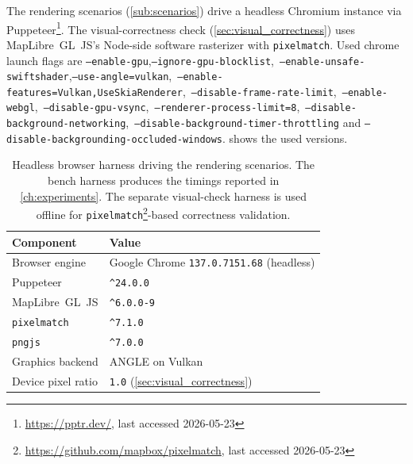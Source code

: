 The rendering scenarios (\cref{sub:scenarios}) drive a headless Chromium instance via Puppeteer\footnote{\url{https://pptr.dev/}, last accessed 2026-05-23}.
The visual-correctness check (\cref{sec:visual_correctness}) uses MapLibre~GL~JS's Node-side software rasterizer with \texttt{pixelmatch}.
Used chrome launch flags are \texttt{--enable-gpu},\allowbreak\texttt{--ignore-gpu-blocklist},\allowbreak\
\texttt{--enable-unsafe-swiftshader},\allowbreak\texttt{--use-angle=vulkan},\allowbreak\
\texttt{--enable-features=Vulkan,UseSkiaRenderer},\allowbreak\
\texttt{--disable-frame-rate-limit},\allowbreak\
\texttt{--enable-webgl},\allowbreak\
\texttt{--disable-gpu-vsync},\allowbreak\
\texttt{--renderer-process-limit=8},\allowbreak\
\texttt{--disable-background-networking},\allowbreak\
\texttt{--disable-background-timer-throttling} and
\texttt{--disable-backgrounding-occluded-windows}.
\Cref{tab:bench_browser} shows the used versions.

\begin{table}[H]
	\centering
	\begin{tabular}{@{}l l@{}}
		\toprule
		\textbf{Component} & \textbf{Value} \\
		\midrule
		Browser engine               & Google Chrome \texttt{137.0.7151.68} (headless) \\
		Puppeteer                    & \texttt{\textasciicircum24.0.0} \\
		MapLibre~GL~JS               & \texttt{\textasciicircum6.0.0-9} \\
		\texttt{pixelmatch}          & \texttt{\textasciicircum7.1.0} \\
		\texttt{pngjs}               & \texttt{\textasciicircum7.0.0} \\
		Graphics backend             & ANGLE on Vulkan \\
		Device pixel ratio           & \texttt{1.0} (\cref{sec:visual_correctness}) \\
		\bottomrule
	\end{tabular}
	\caption[Headless browser harness driving the rendering scenarios.]{%
Headless browser harness driving the rendering scenarios.
The bench harness produces the timings reported in \cref{ch:experiments}.
The separate visual-check harness is used offline for \texttt{pixelmatch}\protect\footnote{\url{https://github.com/mapbox/pixelmatch}, last accessed 2026-05-23}-based correctness validation.}
	\label{tab:bench_browser}
\end{table}

